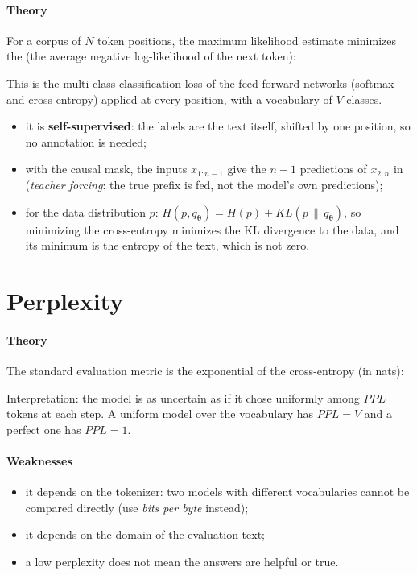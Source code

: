 \paragraph{Theory}
For a corpus of $N$ token positions, the maximum likelihood estimate minimizes the
 (the average negative log-likelihood of the next token):
\begin{center}
\end{center}
This is the multi-class classification loss of the feed-forward networks (softmax and
cross-entropy) applied at every position, with a vocabulary of $V$ classes.
\begin{itemize}
    \item it is \textbf{self-supervised}: the labels are the text itself, shifted by one
        position, so no annotation is needed;
    \item with the causal mask, the inputs $x_{1:n-1}$ give the $n-1$ predictions
        of $x_{2:n}$ in  (\emph{teacher forcing}: the true
        prefix is fed, not the model's own predictions);
    \item for the data distribution $p$: $H(p,q_{\bm{\theta}}) = H(p) + KL\left(p\,\|\,
        q_{\bm{\theta}}\right)$, so minimizing the cross-entropy minimizes the KL
        divergence to the data, and its minimum is the entropy of the text, which is not zero.
\end{itemize}

\section{Perplexity}
\paragraph{Theory}
The standard evaluation metric is the exponential of the cross-entropy (in nats):
\begin{center}
\end{center}
Interpretation: the model is as uncertain as if it chose uniformly among $PPL$ tokens at
each step. A uniform model over the vocabulary has $PPL=V$ and a perfect one has $PPL=1$.

\paragraph{Weaknesses}
\begin{itemize}
    \item it depends on the tokenizer: two models with different vocabularies cannot be
        compared directly (use \emph{bits per byte} instead);
    \item it depends on the domain of the evaluation text;
    \item a low perplexity does not mean the answers are helpful or true.
\end{itemize}
